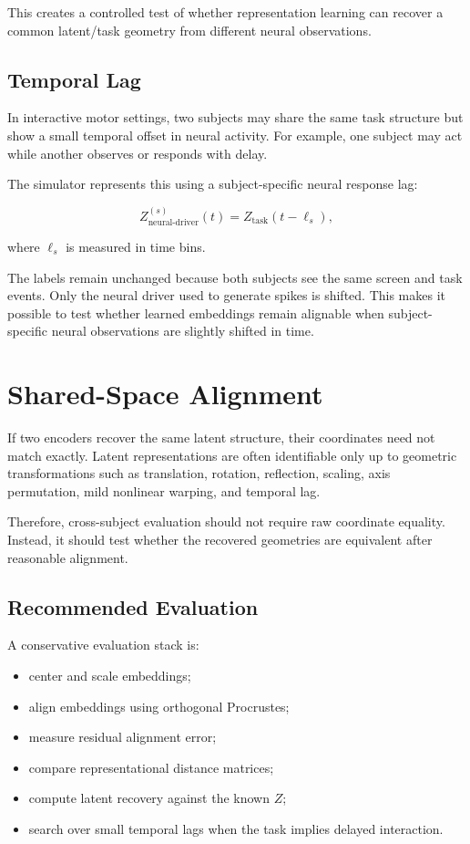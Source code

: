 \documentclass[11pt]{article}
\begin{document}
This creates a controlled test of whether representation learning can recover a
common latent/task geometry from different neural observations.

\subsection{Temporal Lag}

In interactive motor settings, two subjects may share the same task structure
but show a small temporal offset in neural activity. For example, one subject
may act while another observes or responds with delay.

The simulator represents this using a subject-specific neural response lag:

\begin{equation}
Z_{\text{neural-driver}}^{(s)}(t) = Z_{\text{task}}(t - \ell_s),
\end{equation}

where $\ell_s$ is measured in time bins.

The labels remain unchanged because both subjects see the same screen and task
events. Only the neural driver used to generate spikes is shifted. This makes it
possible to test whether learned embeddings remain alignable when
subject-specific neural observations are slightly shifted in time.

\section{Shared-Space Alignment}

If two encoders recover the same latent structure, their coordinates need not
match exactly. Latent representations are often identifiable only up to
geometric transformations such as translation, rotation, reflection, scaling,
axis permutation, mild nonlinear warping, and temporal lag.

Therefore, cross-subject evaluation should not require raw coordinate equality.
Instead, it should test whether the recovered geometries are equivalent after
reasonable alignment.

\subsection{Recommended Evaluation}

A conservative evaluation stack is:

\begin{itemize}
    \item center and scale embeddings;
    \item align embeddings using orthogonal Procrustes;
    \item measure residual alignment error;
    \item compare representational distance matrices;
    \item compute latent recovery against the known $Z$;
    \item search over small temporal lags when the task implies delayed
    interaction.
\end{itemize}
\end{document}
